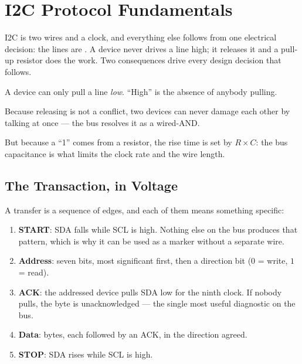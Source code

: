 \section{I2C Protocol Fundamentals}
\label{sec:i2c-fundamentals}

I2C is two wires and a clock, and everything else follows from one electrical decision: the
lines are . A device never drives a line high; it releases it and a
pull-up resistor does the work. Two consequences drive every design decision that follows.

\begin{keytakeaways}
    \item A device can only pull a line \emph{low}. ``High'' is the absence of anybody
          pulling.
    \item Because releasing is not a conflict, two devices can never damage each other by
          talking at once — the bus resolves it as a wired-AND.
    \item But because a ``1'' comes from a resistor, the rise time is set by
          $R \times C$: the bus capacitance is what limits the clock rate and the wire length.
\end{keytakeaways}

\subsection{The Transaction, in Voltage}

A transfer is a sequence of edges, and each of them means something specific:

\begin{enumerate}
    \item \textbf{START}: SDA falls while SCL is high. Nothing else on the bus produces that
          pattern, which is why it can be used as a marker without a separate wire.
    \item \textbf{Address}: seven bits, most significant first, then a direction bit
          ($0$ = write, $1$ = read).
    \item \textbf{ACK}: the addressed device pulls SDA low for the ninth clock. If nobody
          pulls, the byte is unacknowledged — the single most useful diagnostic on the bus.
    \item \textbf{Data}: bytes, each followed by an ACK, in the direction agreed.
    \item \textbf{STOP}: SDA rises while SCL is high.
\end{enumerate}

